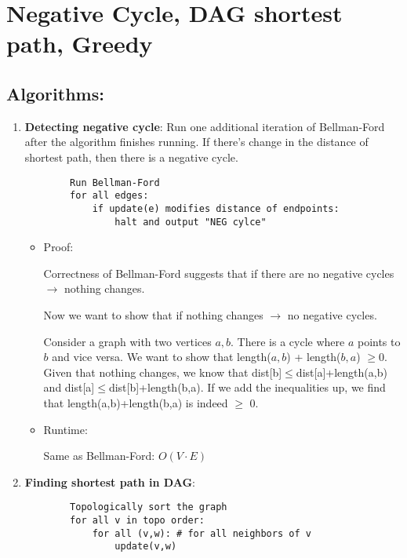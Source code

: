\section[Negative Cycle, DAG shortest path, Greedy -- {\it Lecture 8}]{Negative Cycle, DAG shortest path, Greedy}

\subsection{Algorithms: }
    \begin{enumerate}
        \item \textbf{Detecting negative cycle}: Run one additional iteration of Bellman-Ford after the algorithm finishes running. If there's change in the distance of shortest path, then there is a negative cycle.
        \begin{verbatim}
        Run Bellman-Ford
        for all edges:
            if update(e) modifies distance of endpoints:
                halt and output "NEG cylce"
        \end{verbatim}

        \begin{itemize}
            \item Proof:
            
            Correctness of Bellman-Ford suggests that if there are no negative cycles $\rightarrow$ nothing changes.
            
            Now we want to show that if nothing changes $\rightarrow$ no negative cycles.

            Consider a graph with two vertices $a, b$. There is a cycle where $a$ points to $b$ and vice versa. We want to show that length($a, b$) + length($b, a$) $\geq$0. Given that nothing changes, we know that dist[b]$\leq$dist[a]+length(a,b) and dist[a]$\leq$dist[b]+length(b,a). If we add the inequalities up, we find that length(a,b)+length(b,a) is indeed $\geq$ 0.

            \item Runtime:

            Same as Bellman-Ford: $O(V\cdot E)$
            
        \end{itemize}

        \item \textbf{Finding shortest path in DAG}:
        \begin{verbatim}
        Topologically sort the graph
        for all v in topo order:
            for all (v,w): # for all neighbors of v
                update(v,w)
        \end{verbatim}


\end{enumerate}
